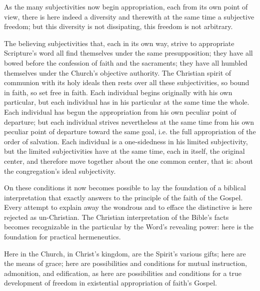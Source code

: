 \documentclass[12pt,a4paper]{book}
\begin{document}
As the many subjectivities now begin appropriation, each from its own point of view, there is here indeed
a diversity and therewith at the same time a subjective freedom; but this diversity is not dissipating,
this freedom is not arbitrary.

The believing subjectivities that, each in its own way, strive to appropriate Scripture's word all find
themselves under the same presupposition; they have all bowed before the confession of faith and the
sacraments; they have all humbled themselves under the Church's objective authority. The Christian spirit
of communion with its holy ideals then rests over all these subjectivities, so bound in faith, so set free
in faith. Each individual begins originally
with his own particular, but each individual has in his particular at the same time the whole. Each
individual has begun the appropriation from his own peculiar point of departure; but each individual
strives nevertheless at the same time from his own peculiar point of departure toward the same goal, i.e.
the full appropriation of the order of salvation. Each individual is a one-sidedness in his limited
subjectivity, but the limited subjectivities have at the same time, each in itself, the original center,
and therefore move together about the one common center, that is: about the congregation's ideal
subjectivity.

On these conditions it now becomes possible to lay the foundation of a biblical interpretation that
exactly answers to the principle of the faith of the Gospel. Every attempt to explain away the wondrous and
to efface the distinctive is here rejected as un-Christian. The Christian interpretation of the Bible's
facts becomes recognizable in the particular by the Word's revealing power: here is the foundation for
practical hermeneutics.

Here in the Church, in Christ's kingdom, are the Spirit's various gifts; here are the means of grace; here
are possibilities and conditions for mutual instruction, admonition, and edification, as here are
possibilities and conditions for a true development of freedom in existential appropriation of faith's
Gospel.
\end{document}

